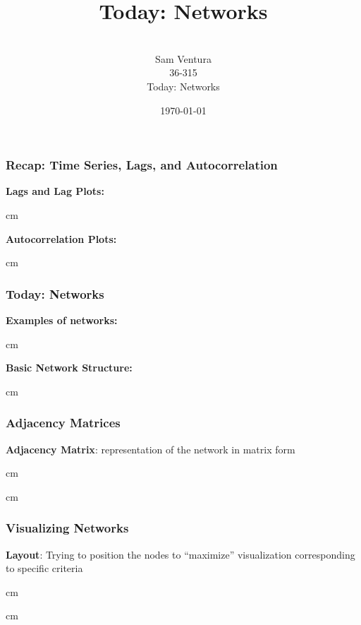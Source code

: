 \documentclass{beamer} %
\begin{document}
\title[dedup]{Today:  Networks}


\author[Samuel L. Ventura]{\\
  \large{Sam Ventura\\36-315\\Today:  Networks}}
\date{\today}


\begin{frame}
	\maketitle

	
\end{frame}



\begin{frame}\frametitle{Recap:  Time Series, Lags, and Autocorrelation}
	\small
	\textbf{Lags and Lag Plots:}

	 cm
	
	\textbf{Autocorrelation Plots:}
	
	 cm
		
\end{frame}


\begin{frame}\frametitle{Today:  Networks}
	\small
	
	\textbf{Examples of networks:}
	
	 cm
	
	\textbf{Basic Network Structure:}
	
	 cm
	
\end{frame}




\begin{frame}\frametitle{Adjacency Matrices}
	\small
	
	\textbf{Adjacency Matrix}:  representation of the network in matrix form
	
	 cm
	
	 cm
	
\end{frame}




\begin{frame}\frametitle{Visualizing Networks}
	\small
	
	\textbf{Layout}:  Trying to position the nodes to ``maximize'' visualization corresponding to specific criteria
	
	 cm
	
	
	 cm
	
\end{frame}
\end{document}

